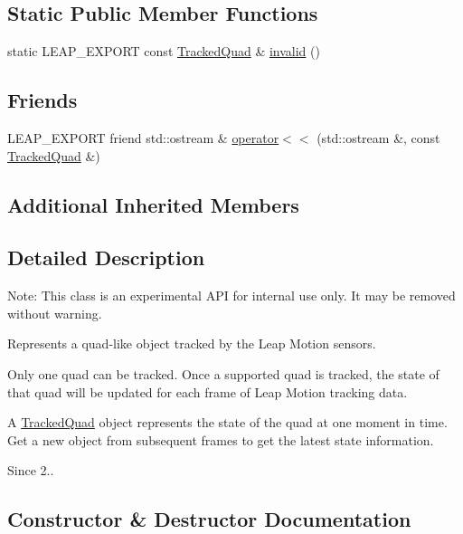 \subsection*{Static Public Member Functions}
\begin{DoxyCompactItemize}
\item 
static L\+E\+A\+P\+\_\+\+E\+X\+P\+O\+RT const \hyperlink{class_leap_1_1_tracked_quad}{Tracked\+Quad} \& \hyperlink{class_leap_1_1_tracked_quad_ab9742292d499c87642dcadfde87385c5}{invalid} ()
\end{DoxyCompactItemize}
\subsection*{Friends}
\begin{DoxyCompactItemize}
\item 
L\+E\+A\+P\+\_\+\+E\+X\+P\+O\+RT friend std\+::ostream \& \hyperlink{class_leap_1_1_tracked_quad_a954712e5d46bca5109e8508a9397538a}{operator$<$$<$} (std\+::ostream \&, const \hyperlink{class_leap_1_1_tracked_quad}{Tracked\+Quad} \&)
\end{DoxyCompactItemize}
\subsection*{Additional Inherited Members}


\subsection{Detailed Description}
Note\+: This class is an experimental A\+PI for internal use only. It may be removed without warning.

Represents a quad-\/like object tracked by the Leap Motion sensors.

Only one quad can be tracked. Once a supported quad is tracked, the state of that quad will be updated for each frame of Leap Motion tracking data.

A \hyperlink{class_leap_1_1_tracked_quad}{Tracked\+Quad} object represents the state of the quad at one moment in time. Get a new object from subsequent frames to get the latest state information. \begin{DoxySince}{Since}
2.. 
\end{DoxySince}


\subsection{Constructor \& Destructor Documentation}
\mbox{\label{class_leap_1_1_tracked_quad_a58cbed47b386a0a4273c8e2f5eb9cd25}} 
